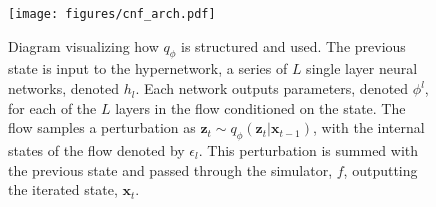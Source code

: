\begin{figure}
    \centering
    \texttt{[image: figures/cnf\_arch.pdf]}
    \caption{Diagram visualizing how $q_{\phi}$ is structured and used. 
    The previous state is input to the hypernetwork, a series of $L$ single layer neural networks, denoted $h_l$.
    Each network outputs parameters, denoted $\phi^l$, for each of the $L$ layers in the flow conditioned on the state.
    The flow samples a perturbation as $\mathbf{z}_t \sim q_{\phi}\left(\mathbf{z}_t | \mathbf{x}_{t-1} \right)$, with the internal states of the flow denoted by $\epsilon_l$.
    This perturbation is summed with the previous state and passed through the simulator, $f$, outputting the iterated state, $\mathbf{x}_t$.
    }
    \label{fig:meth:cnf_arch}
\end{figure}